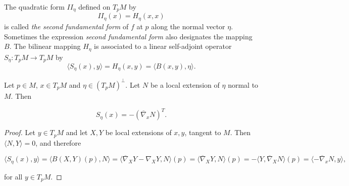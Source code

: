 \begin{definition}
  \label{def:dc-ch6-2-2}


  The quadratic form $\mathit{II}_\eta$ defined on $T_pM$ by
  $$
  \mathit{II}_\eta(x)=H_\eta(x,x)
  $$
  is called \emph{the second fundamental form} of $f$ at $p$ along the normal vector
  $\eta$. Sometimes the expression \emph{second fundamental form} also designates the
  mapping $B$. The bilinear mapping $H_\eta$ is associated to a linear self-adjoint
  operator $S_\eta:T_pM\to T_pM$ by
  $$
  \langle S_\eta(x),y\rangle=H_\eta(x,y)=\langle B(x,y),\eta\rangle.
  $$
\end{definition}

\begin{proposition}
  \label{prop:dc-ch6-2-3}


  Let $p\in M$, $x\in T_pM$ and $\eta\in(T_pM)^\perp$. Let $N$ be a local extension
  of $\eta$ normal to $M$. Then

  $$
  S_\eta(x)=-(\overline{\nabla}_x N)^T.
  $$
\end{proposition}
\begin{proof}

  \sketch
  Let $y\in T_pM$ and let $X,Y$ be local extensions of $x,y$, tangent to
  $M$. Then $\langle N,Y\rangle=0$, and therefore

  $$
  \langle S_\eta(x),y\rangle=\langle B(X,Y)(p),N\rangle=\langle\overline{\nabla}_X Y-\nabla_X Y,N\rangle(p)=\langle\overline{\nabla}_X Y,N\rangle(p)=-\langle Y,\overline{\nabla}_X N\rangle(p)=\langle-\overline{\nabla}_x N,y\rangle,
  $$

  for all $y\in T_pM$.
\end{proof}

